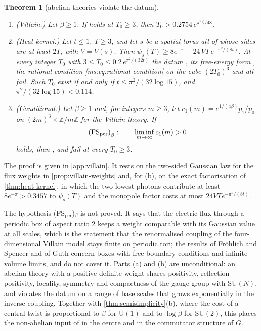 \documentclass[11pt,a4paper]{amsart}
\newtheorem{theorem}{Theorem}[section]
\theoremstyle{definition}
\theoremstyle{remark}
\numberwithin{equation}{section}
\newcommand{\Z}{\mathbb{Z}}          %
\newcommand{\SU}{\mathrm{SU}}              %
\newcommand{\U}{\mathrm{U}}                %
\newcommand{\psiT}[2]{\psi_{#1}(#2)}       %
\newcommand{\Vol}[1]{V(#1)}                %
\newcommand{\cube}[1]{(2#1)^3}             %
\newcommand{\Mcirc}{\text{\upshape(M$^{\circ}$)}}   %
\newcommand{\Bcirc}{\text{\upshape(B$^{\circ}$)}}   %
\newcommand{\Bstar}{\text{\upshape(B$^{*}$)}}       %
\begin{document}
\begin{theorem}[abelian theories violate the datum]\label{thm:abelian}
\begin{enumerate}[label=\textup{(\alph*)},leftmargin=*]
\item \textup{(Villain.)} Let $\beta\ge1$. If \Bstar{} holds at $T_0\ge3$, then $T_0>0.2754\,e^{\pi^2\beta/48}$.
\item \textup{(Heat kernel.)} Let $t\le1$, $T\ge3$, and let $s$ be a spatial torus all of whose sides are at least $2T$, with $V=\Vol{s}$. Then $\psiT sT\ge8e^{-\pi}-24\,VT\,e^{-\pi^2/(8t)}$. At every integer $T_0$ with $3\le T_0\le0.2\,e^{\pi^2/(32t)}$ the datum \Mcirc{}, its free-energy form \Bcirc{}, the rational condition \eqref{ms:eq:rational-condition} on the cube $\cube{T_0}$ and \Bstar{} all fail. Such $T_0$ exist if and only if $t\le\pi^2/(32\log15)$, and $\pi^2/(32\log15)<0.114$.
\item \textup{(Conditional.)} Let $\beta\ge1$ and, for integers $m\ge3$, let $c_1(m)=e^{1/(4\beta)}p_1/p_0$ on $\cube m\times\Z/m\Z$ for the Villain theory. If
\[
\textup{(FS$_{\mathrm{per}}$)}_\beta:\qquad\liminf_{m\to\infty}c_1(m)>0
\]
holds, then \Bcirc{}, \Mcirc{} and \Bstar{} fail at every $T_0\ge3$.
\end{enumerate}
\end{theorem}

The proof is given in \cref{app:villain}. It rests on the two-sided Gaussian law for the flux weights in \cref{prop:villain-weights} and, for (b), on the exact factorisation of \cref{thm:heat-kernel}, in which the two lowest photons contribute at least $8e^{-\pi}>0.3457$ to $\psiT sT$ and the monopole factor costs at most $24VTe^{-\pi^2/(8t)}$.

The hypothesis \textup{(FS$_{\mathrm{per}}$)}$_\beta$ is not proved. It says that the electric flux through a periodic box of aspect ratio $2$ keeps a weight comparable with its Gaussian value at all scales, which is the statement that the renormalised coupling of the four-dimensional Villain model stays finite on periodic tori; the results of Fr\"ohlich and Spencer \cite{frohlich1982} and of Guth \cite{guth1980} concern boxes with free boundary conditions and infinite-volume limits, and do not cover it. Parts (a) and (b) are unconditional: an abelian theory with a positive-definite weight shares positivity, reflection positivity, locality, symmetry and compactness of the gauge group with $\SU(N)$, and violates the datum on a range of base scales that grows exponentially in the inverse coupling. Together with \cref{thm:semisimplicity}(b), where the cost of a central twist is proportional to $\beta$ for $\U(1)$ and to $\log\beta$ for $\SU(2)$, this places the non-abelian input of \Mcirc{} in the centre and in the commutator structure of $G$.
\end{document}
